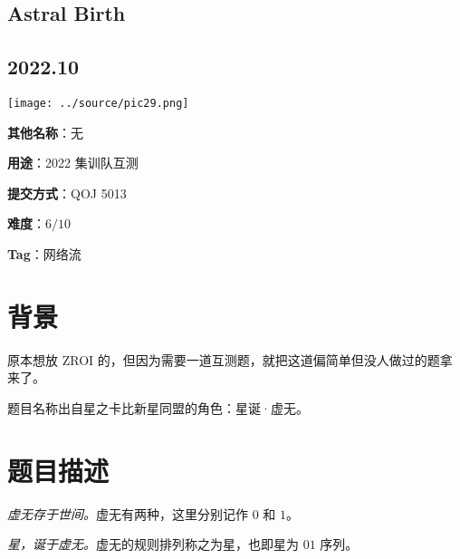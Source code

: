 \documentclass[a4paper,10pt]{article}
\begin{document}
\newpage

\vspace*{\fill}
\begin{center}

\section{Astral Birth}

\subsection*{2022.10}

\vspace{10pt}

\texttt{[image: ../source/pic29.png]}

\vspace{10pt}

\textbf{其他名称}：无

\vspace{10pt}

\textbf{用途}：2022 集训队互测

\vspace{10pt}

\textbf{提交方式}：QOJ 5013

\vspace{10pt}

\textbf{难度}：$6/10$

\vspace{10pt}

\textbf{Tag}：网络流

\end{center}
\vspace*{\fill}

\newpage

\section*{背景}

原本想放 ZROI 的，但因为需要一道互测题，就把这道偏简单但没人做过的题拿来了。

题目名称出自星之卡比新星同盟的角色：星诞·虚无。

\section*{题目描述}

\textit{虚无存于世间。}虚无有两种，这里分别记作 $0$ 和 $1$。

\textit{星，诞于虚无。}虚无的规则排列称之为星，也即星为 $01$ 序列。
\end{document}
